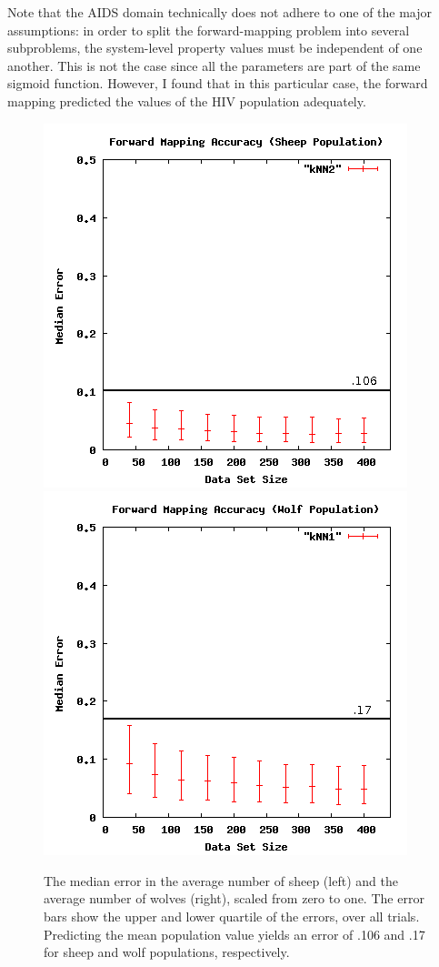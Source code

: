 Note that the AIDS domain technically does not adhere to one of the major assumptions: in order to split the forward-mapping problem into several subproblems, the system-level property values must be independent of one another.
This is not the case since all the parameters are part of the same sigmoid function.
However, I found that in this particular case, the forward mapping predicted the values of the HIV population adequately.


\begin{figure}[ht]
\centering
\includegraphics[scale=.4]{images/results_wolfsheep/fm-sheep-pop.png}
\includegraphics[scale=.4]{images/results_wolfsheep/fm-wolf-pop.png}
\caption{The median error in the average number of sheep (left) and the average number of wolves (right), scaled from zero to one.
The error bars show the upper and lower quartile of the errors, over all trials.
Predicting the mean population value yields an error of .106 and .17 for sheep and wolf populations, respectively.}
\label{fig:wolfsheeppop}
\end{figure}


